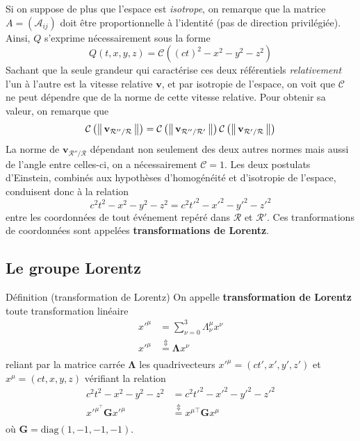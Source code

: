     Si on suppose de plus que l’espace est \textit{isotrope}, on remarque que la matrice $A = (\mathcal{A}_{ij})$ doit être proportionnelle à l’identité (pas de direction privilégiée). Ainsi, $Q$ s’exprime nécessairement sous la forme 
    \[ Q(t,x,y,z) = \mathcal{C}\left((ct)^2 - x^2 - y^2 - z^2\right) \]   
    Sachant que la seule grandeur qui caractérise ces deux référentiels \textit{relativement} l’un à l’autre est la vitesse relative $\mathbf{v}$, et par isotropie de l’espace, on voit que $\mathcal{C}$ ne peut dépendre que de la norme de cette vitesse relative. Pour obtenir sa valeur, on remarque que 
    \[ \mathcal{C}\left(\left\lVert \, \mathbf{v}_{\mathcal{R}''/\mathcal{R}} \, \right\rVert\right) = \mathcal{C}\left(\left\lVert \, \mathbf{v}_{\mathcal{R}''/\mathcal{R}'} \, \right\rVert\right)\mathcal{C}\left(\left\lVert \, \mathbf{v}_{\mathcal{R}'/\mathcal{R}} \, \right\rVert\right) \]
    La norme de $\mathbf{v}_{\mathcal{R}''/\mathcal{R}}$ dépendant non seulement des deux autres normes mais aussi de l’angle entre celles-ci, on a nécessairement $\mathcal{C} = 1$. Les deux postulats d’Einstein, combinés aux hypothèses d’homogénéité et d’isotropie de l’espace, conduisent donc à la relation
    \[ c^2 t^2 - x^2 - y^2 - z^2 = c^2 t'^2 - x'^2 - y'^2 - z'^2 \]
    entre les coordonnées de tout événement repéré dans $\mathcal{R}$ et $\mathcal{R}'$. Ces tranformations de coordonnées sont appelées \textbf{transformations de Lorentz}.

    \subsection{Le groupe Lorentz}

    \begin{omed}{Définition (transformation de Lorentz)}
        On appelle \textbf{transformation de Lorentz} toute transformation linéaire 
        \begin{align*}
            x'^{\mu} &= \sum_{\nu = 0}^3 \Lambda_{\nu}^{\mu} x^{\nu} \\
            x'^{\mu} &\overset{\Updownarrow}{=} \symbf{\Lambda} x^{\nu} \\
        \end{align*}
        reliant par la matrice carrée $\symbf{\Lambda}$ les quadrivecteurs $x'^{\mu} = (ct', x', y', z')$ et $x^{\mu} = (ct,x,y,z)$ vérifiant la relation 
        \begin{align*}
            c^2 t^2 - x^2 - y^2 - z^2 &= c^2 t'^2 - x'^2 - y'^2 - z'^2 \\
            x'^{\mu}^{\top} \mathbf{G} x'^{\mu} &\overset{\Updownarrow}{=} x^{\mu\top} \mathbf{G} x^{\mu} \\
        \end{align*}
        où $\mathbf{G} = \text{diag}(1, -1, -1, -1)$.
    \end{omed}

